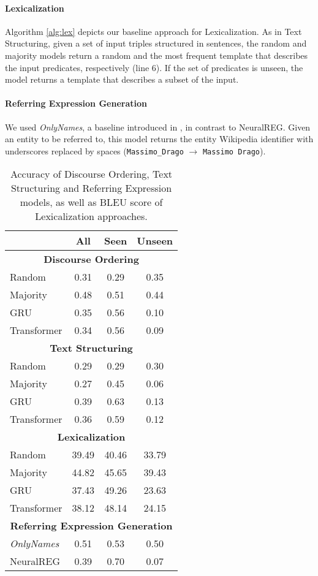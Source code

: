 \documentclass[11pt,a4paper]{article}
\begin{document}
\paragraph{Lexicalization} Algorithm \ref{alg:lex} depicts our baseline approach for Lexicalization. As in Text Structuring, given a set of input triples structured in sentences, the random and majority models return a random and the most frequent template that describes the input predicates, respectively (line 6). If the set of predicates is unseen, the model returns a template that describes a subset of the input.

\paragraph{Referring Expression Generation} We used \textit{OnlyNames}, a baseline introduced in \citet{ferreira2018}, in contrast to NeuralREG. Given an entity to be referred to, this model returns the entity Wikipedia identifier with underscores replaced by spaces (\texttt{Massimo\_Drago} $\rightarrow$ \texttt{Massimo Drago}).

\begin{table}
\centering
\footnotesize{
\begin{tabular}{l c c c}
\toprule
                         & \textbf{All} & \textbf{Seen} & \textbf{Unseen} \\
\midrule
\multicolumn{4}{c}{\bf Discourse Ordering}\\
\midrule
Random      & 0.31 & 0.29 & 0.35 \\
Majority    & 0.48 & 0.51 & 0.44 \\
GRU         & 0.35 & 0.56 & 0.10 \\
Transformer & 0.34 & 0.56 & 0.09 \\
\midrule
\multicolumn{4}{c}{\bf Text Structuring}\\
\midrule
Random      & 0.29 & 0.29 & 0.30 \\
Majority    & 0.27 & 0.45 & 0.06 \\
GRU         & 0.39 & 0.63 & 0.13 \\
Transformer & 0.36 & 0.59 & 0.12 \\
\midrule
\multicolumn{4}{c}{\bf Lexicalization}\\
\midrule
Random      & 39.49 & 40.46 & 33.79 \\
Majority    & 44.82 & 45.65 & 39.43 \\
GRU         & 37.43 & 49.26 & 23.63 \\
Transformer & 38.12 & 48.14 & 24.15 \\
\midrule
\multicolumn{4}{c}{\bf Referring Expression Generation}\\
\midrule
\textit{OnlyNames} & 0.51 & 0.53 & 0.50 \\
NeuralREG          & 0.39 & 0.70 & 0.07 \\
\bottomrule
\end{tabular}
}
\caption{Accuracy of Discourse Ordering, Text Structuring and Referring Expression models, as well as BLEU score of Lexicalization approaches.}
\label{table:results1}
\end{table}
\end{document}
